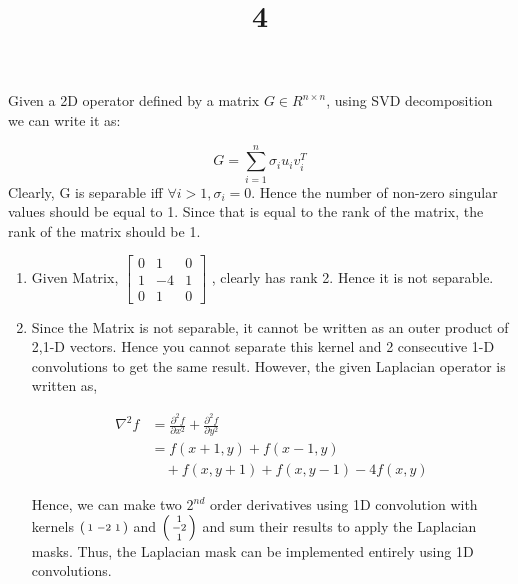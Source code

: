 \documentclass[a4paper]{article}
\title{4}
\date{}
\begin{document}
\maketitle


Given a 2D operator defined by a matrix $G \in R^{n\times n}$, using SVD decomposition we can write it as:

\begin{equation}
    G = \sum_{i = 1}^{n} \sigma_{i}u_{i}v_{i}^T
\end{equation}
Clearly, G is separable iff $\forall i > 1, \sigma_i = 0$.
Hence the number of non-zero singular values should be equal to 1. Since that is equal to the rank of the matrix, the rank of the matrix should be 1.

\begin{enumerate}[label=(\alph*)]
    \item Given Matrix,
$
\begin{bmatrix}

    0 & 1 & 0 \\
    1 & -4 & 1\\
    0 & 1 & 0 
    
\end{bmatrix}
$
, clearly has rank 2. Hence it is not separable.

\item Since the Matrix is not separable, it cannot be written as an outer product of 2,1-D vectors. Hence you cannot separate this kernel and 2 consecutive  1-D convolutions to get the same result. However, the given Laplacian operator is written as,

\begin{align*}
    \nabla^2 f &= \frac{\partial^2 f}{\partial x^2} + \frac{\partial^2 f}{\partial y^2}\\
    &= f(x+1,y) + f(x-1,y) \\
    &\quad+ f(x,y+1) + f(x,y-1) - 4f(x,y)
\end{align*}

Hence, we can make two $2^{nd}$ order derivatives using 1D convolution with kernels
$ \begin{psmallmatrix*}[c]1&-2&1 \end{psmallmatrix*} $
and
$ \begin{psmallmatrix*}[c]1\\-2\\1 \end{psmallmatrix*} $ and sum their results  to apply the Laplacian masks.
Thus, the Laplacian mask can be implemented entirely using 1D convolutions.
\end{enumerate}
\end{document}
